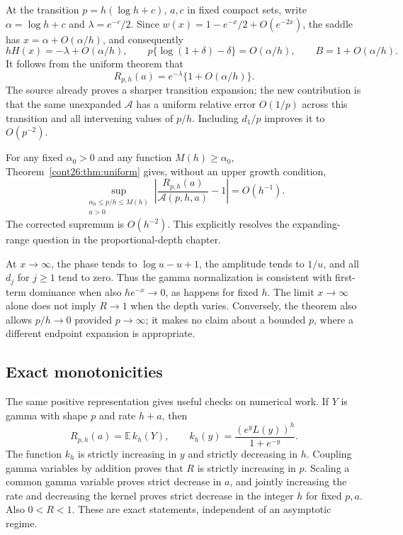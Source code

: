 \documentclass[11pt,letterpaper]{article}
\numberwithin{equation}{section}
\theoremstyle{plain}
\theoremstyle{definition}
\theoremstyle{remark}
\begin{document}
At the transition $p=h(\log h+c)$, $a,c$ in fixed compact sets,
write $\alpha=\log h+c$ and $\lambda=e^{-c}/2$.
Since $w(x)=1-e^{-x}/2+O(e^{-2x})$, the saddle has
$x=\alpha+O(\alpha/h)$, and consequently
\[
 hH(x)=-\lambda+O(\alpha/h),\qquad
 p\{\log(1+\delta)-\delta\}=O(\alpha/h),\qquad
 B=1+O(\alpha/h).
\]
It follows from the uniform theorem that
\[
 R_{p,h}(a)=e^{-\lambda}\{1+O(\alpha/h)\}.
\]
The source already proves a sharper transition expansion; the new
contribution is that the same unexpanded $\mathcal A$ has a uniform
relative error $O(1/p)$ across this transition and all intervening
values of $p/h$. Including $d_1/p$ improves it to $O(p^{-2})$.

For any fixed $\alpha_0>0$ and any function $M(h)\geq\alpha_0$,
Theorem~\ref{cont26:thm:uniform} gives, without an upper growth condition,
\begin{equation}\label{cont26:eq:expanding-range}
 \sup_{\substack{\alpha_0\leq p/h\leq M(h)\\a>0}}
 \left|\frac{R_{p,h}(a)}{\mathcal A(p,h,a)}-1\right|=O(h^{-1}).
\end{equation}
The corrected supremum is $O(h^{-2})$. This explicitly resolves the
expanding-range question in the proportional-depth chapter.

At $x\to\infty$, the phase tends to $\log u-u+1$, the amplitude
tends to $1/u$, and all $d_j$ for $j\geq1$ tend to zero. Thus the
gamma normalization is consistent with first-term dominance when also
$h e^{-x}\to0$, as happens for fixed $h$. The limit $x\to\infty$
alone does not imply $R\to1$ when the depth varies. Conversely,
the theorem also allows $p/h\to0$ provided $p\to\infty$; it makes
no claim about a bounded $p$, where a different endpoint expansion is
appropriate.

\subsection{Exact monotonicities}
The same positive representation gives useful checks on numerical work.
If $Y$ is gamma with shape $p$ and rate $h+a$, then
\[
 R_{p,h}(a)=\mathbb E\,k_h(Y),\qquad
 k_h(y)=\frac{(e^yL(y))^h}{1+e^{-y}}.
\]
The function $k_h$ is strictly increasing in $y$ and strictly decreasing
in $h$. Coupling gamma variables by addition proves that $R$ is strictly
increasing in $p$. Scaling a common gamma variable proves strict decrease
in $a$, and jointly increasing the rate and decreasing the kernel proves
strict decrease in the integer $h$ for fixed $p,a$. Also $0<R<1$.
These are exact statements, independent of an asymptotic regime.
\end{document}
